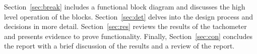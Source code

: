 Section~\ref{sec:break} includes a functional block diagram and discusses the high level operation of the blocks. Section~\ref{sec:det} delves into the design process and decisions in more detail. Section~\ref{sec:res} reviews the results of the tachometer and presents evidence to prove functionality. Finally, Section~\ref{sec:con} concludes the report with a brief discussion of the results and a review of the report.